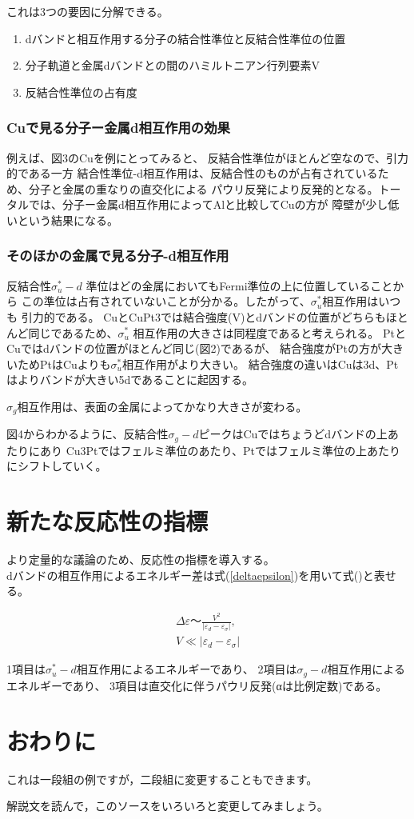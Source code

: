 \documentclass[12pt]{ltjsarticle}
\begin{document}
これは3つの要因に分解できる。
\begin{enumerate}
  \item dバンドと相互作用する分子の結合性準位と反結合性準位の位置
  \item 分子軌道と金属dバンドとの間のハミルトニアン行列要素V
  \item 反結合性準位の占有度
\end{enumerate}

\subsubsection{Cuで見る分子ー金属d相互作用の効果}
例えば、図3のCuを例にとってみると、
反結合性準位がほとんど空なので、引力的である一方
結合性準位-d相互作用は、反結合性のものが占有されているため、分子と金属の重なりの直交化による
パウリ反発により反発的となる。トータルでは、分子ー金属d相互作用によってAlと比較してCuの方が
障壁が少し低いという結果になる。

\subsubsection{そのほかの金属で見る分子-d相互作用}
反結合性$ \sigma _u ^* -d$ 準位はどの金属においてもFermi準位の上に位置していることから
この準位は占有されていないことが分かる。したがって、$ \sigma _u ^*$相互作用はいつも
引力的である。
CuとCuPt3では結合強度(V)とdバンドの位置がどちらもほとんど同じであるため、$ \sigma _u ^*$
相互作用の大きさは同程度であると考えられる。
PtとCuではdバンドの位置がほとんど同じ(図2)であるが、
結合強度がPtの方が大きいためPtはCuよりも$ \sigma _u ^*$相互作用がより大きい。
結合強度の違いはCuは3d、Ptはよりバンドが大きい5dであることに起因する。

$\sigma _g$相互作用は、表面の金属によってかなり大きさが変わる。

図4からわかるように、反結合性$\sigma _g -d$ピークはCuではちょうどdバンドの上あたりにあり
Cu3Ptではフェルミ準位のあたり、Ptではフェルミ準位の上あたりにシフトしていく。

\section{新たな反応性の指標}
より定量的な議論のため、反応性の指標を導入する。\\
dバンドの相互作用によるエネルギー差は式(\ref{deltaepsilon})を用いて式()と表せる。

\begin{eqnarray}
    \label{deltaepsilon}
    \Delta \varepsilon ～ \frac{ V^2 }{| \varepsilon _d - \varepsilon _ \sigma |}, \\
    V \ll |\varepsilon _d - \varepsilon _\sigma|  \nonumber
\end{eqnarray}

1項目は$\sigma _u ^* -d$相互作用によるエネルギーであり、
2項目は$\sigma _g -d$相互作用によるエネルギーであり、
3項目は直交化に伴うパウリ反発(αは比例定数)である。


\section{おわりに}

これは一段組の例ですが，二段組に変更することもできます。

解説文を読んで，このソースをいろいろと変更してみましょう。
\end{document}
